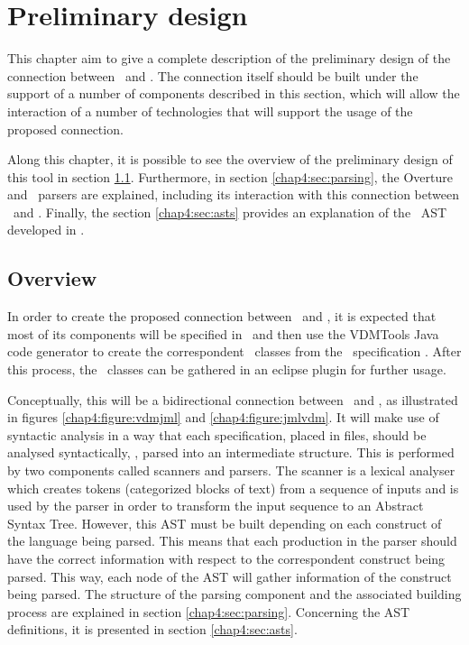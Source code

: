 \chapter{Preliminary design}
\label{chapter4}

This chapter aim to give a complete description of the preliminary design of the connection between \vpp\ and \jml. The connection itself should be built under the support of a number of components described in this section, which will allow the interaction of a number of technologies that will support the usage of the proposed connection. 

Along this chapter, it is possible to see the overview of the preliminary design of this tool in section \ref{chap4:sec:overview}. Furthermore, in section \ref{chap4:sec:parsing}, the Overture and \jml\ parsers are explained, including its interaction with this connection between \vpp\ and \jml. Finally, the section \ref{chap4:sec:asts} provides an explanation of the \jml\ AST developed in \vdm.


\section{Overview}
\label{chap4:sec:overview}

In order to create the proposed connection between \vpp\ and \jml, it is expected that most of its components will be specified in \vpp\ and then use the VDMTools Java code generator to create the correspondent \java\ classes from the \vpp\ specification \cite{vpplangman}. After this process, the \java\ classes can be gathered in an eclipse plugin for further usage.

Conceptually, this will be a bidirectional connection between \vpp\ and \jml, as illustrated in figures \ref{chap4:figure:vdmjml} and \ref{chap4:figure:jmlvdm}. It will make use of syntactic analysis in a way that each specification, placed in files, should be analysed syntactically, \ie, parsed into an intermediate structure. This is performed by two components called scanners and parsers. The scanner is a lexical analyser which creates tokens (categorized blocks of text) from a sequence of inputs and is used by the parser in order to transform the input sequence to an Abstract Syntax Tree. However, this AST must be built depending on each construct of the language being parsed. This means that each production in the parser should have the correct information with respect to the correspondent construct being parsed. This way, each node of the AST will gather information of the construct being parsed. The structure of the parsing component and the associated building process are explained in section \ref{chap4:sec:parsing}. Concerning the AST definitions, it is presented in section \ref{chap4:sec:asts}. 


